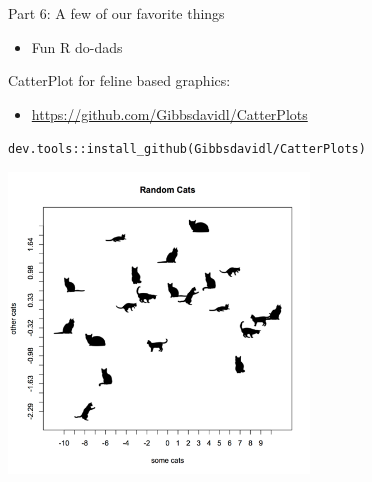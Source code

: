 \documentclass[
  ignorenonframetext,
]{beamer}
\providecommand{\tightlist}{%
  \setlength{\itemsep}{0pt}\setlength{\parskip}{0pt}}
\begin{document}
\begin{frame}{Part 6: A few of our favorite things}
\protect\hypertarget{part-6-a-few-of-our-favorite-things}{}

\begin{itemize}
\tightlist
\item
  Fun R do-dads
\end{itemize}

\end{frame}

\begin{frame}[fragile]{CatterPlot for feline based graphics:}
\protect\hypertarget{catterplot-for-feline-based-graphics}{}

\begin{itemize}
\tightlist
\item
  \url{https://github.com/Gibbsdavidl/CatterPlots}
\end{itemize}

\texttt{dev.tools::install\_github(Gibbsdavidl/CatterPlots)}

\includegraphics[width=0.6\textwidth,height=\textheight]{../external/images/funR_1_catterplotter.png}

\end{frame}
\end{document}

